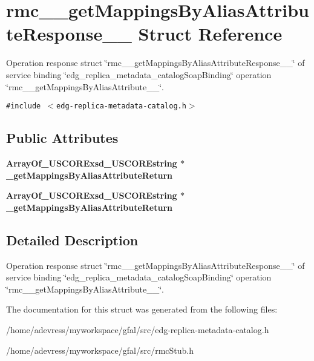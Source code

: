 \section{rmc\_\-\_\-get\-Mappings\-By\-Alias\-Attribute\-Response\_\-\_\- Struct Reference}
\label{structrmc____getMappingsByAliasAttributeResponse____}
Operation response struct \char`\"{}rmc\_\-\_\-get\-Mappings\-By\-Alias\-Attribute\-Response\_\-\_\-\char`\"{} of service binding \char`\"{}edg\_\-replica\_\-metadata\_\-catalog\-Soap\-Binding\char`\"{} operation \char`\"{}rmc\_\-\_\-get\-Mappings\-By\-Alias\-Attribute\_\-\_\-\char`\"{}.  


{\tt \#include $<$edg-replica-metadata-catalog.h$>$}

\subsection*{Public Attributes}
\begin{CompactItemize}
\item 
\bf{Array\-Of\_\-USCORExsd\_\-USCOREstring} $\ast$ \textbf{\_\-get\-Mappings\-By\-Alias\-Attribute\-Return}\label{structrmc____getMappingsByAliasAttributeResponse_____cae8bd5cb957d453a67b5c7c0eb1c36f}

\item 
\bf{Array\-Of\_\-USCORExsd\_\-USCOREstring} $\ast$ \textbf{\_\-get\-Mappings\-By\-Alias\-Attribute\-Return}\label{structrmc____getMappingsByAliasAttributeResponse_____cae8bd5cb957d453a67b5c7c0eb1c36f}

\end{CompactItemize}


\subsection{Detailed Description}
Operation response struct \char`\"{}rmc\_\-\_\-get\-Mappings\-By\-Alias\-Attribute\-Response\_\-\_\-\char`\"{} of service binding \char`\"{}edg\_\-replica\_\-metadata\_\-catalog\-Soap\-Binding\char`\"{} operation \char`\"{}rmc\_\-\_\-get\-Mappings\-By\-Alias\-Attribute\_\-\_\-\char`\"{}. 



The documentation for this struct was generated from the following files:\begin{CompactItemize}
\item 
/home/adevress/myworkspace/gfal/src/edg-replica-metadata-catalog.h\item 
/home/adevress/myworkspace/gfal/src/rmc\-Stub.h\end{CompactItemize}
